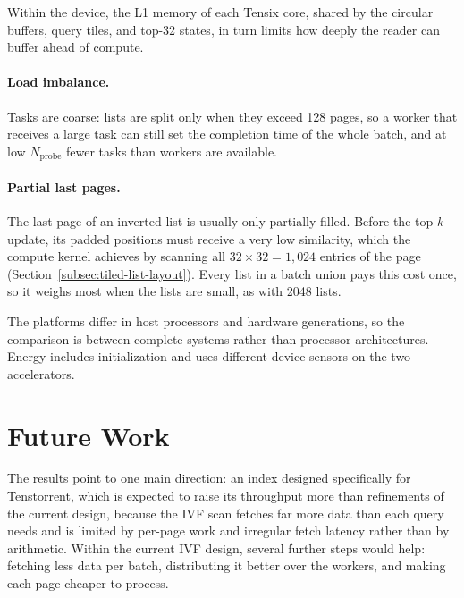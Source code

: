 Within the device, the L1 memory
of each Tensix core, shared by the circular buffers, query tiles, and top-32
states, in turn limits how deeply the reader can buffer ahead of compute.

\paragraph{Load imbalance.} Tasks are coarse: lists are split only when they
exceed 128 pages, so a worker that receives a large task can still set the
completion time of the whole batch, and at low \(N_{\mathrm{probe}}\) fewer
tasks than workers are available.

\paragraph{Partial last pages.} The last page of an inverted list is usually
only partially filled. Before the top-\(k\) update, its padded positions must
receive a very low similarity, which the compute kernel achieves by scanning
all \(32\times32=1{,}024\) entries of the page
(Section~\ref{subsec:tiled-list-layout}). Every list in a batch union pays
this cost once, so it weighs most when the lists are small, as with 2048
lists.

The platforms differ in host processors and hardware generations,
so the comparison is between complete systems rather than processor
architectures. Energy includes initialization and uses different device
sensors on the two accelerators.

\section{Future Work}
\label{sec:future-work}

The results point to one main direction: an index designed specifically for
Tenstorrent, which is expected to raise its throughput more than refinements
of the current design, because the IVF scan fetches far more data than each
query needs and is limited by per-page work and irregular fetch latency rather
than by arithmetic. Within the current IVF design, several further
steps would help: fetching less data per batch, distributing it better over
the workers, and making each page cheaper to process.

